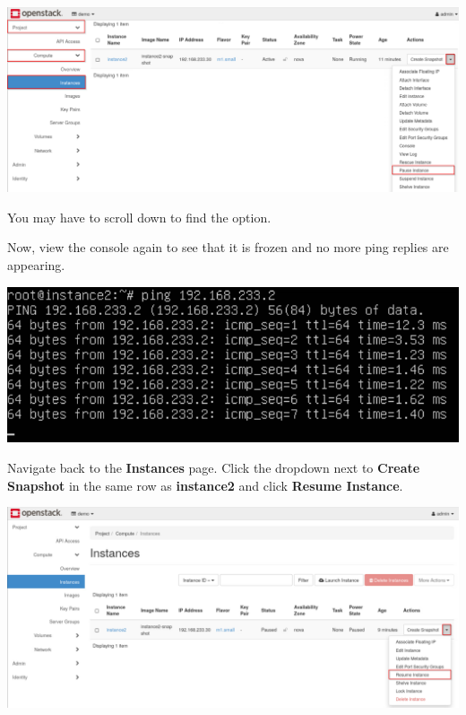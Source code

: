 \documentclass[letterpaper, 12pt]{article}
\begin{document}
\begin{enumerate}
\begin{labstep}
        \begin{center}
            \includegraphics[width=\linewidth]{images/part3/step3.png}
        \end{center}
    \end{labstep}

    \begin{notebox}
        You may have to scroll down to find the option.
    \end{notebox}

    \begin{labstep}
        Now, view the console again to see that it is frozen and no more ping replies are appearing.

        \begin{center}
            \includegraphics[width=\linewidth]{images/part3/step4.png}
        \end{center}
    \end{labstep}

    \begin{labstep}
        Navigate back to the \textbf{Instances} page.
        Click the dropdown next to \textbf{Create Snapshot} in the same row as \textbf{instance2} and click \textbf{Resume Instance}.

        \begin{center}
            \includegraphics[width=\linewidth]{images/part3/step5.png}
        \end{center}
    \end{labstep}


\end{enumerate}
\end{document}
